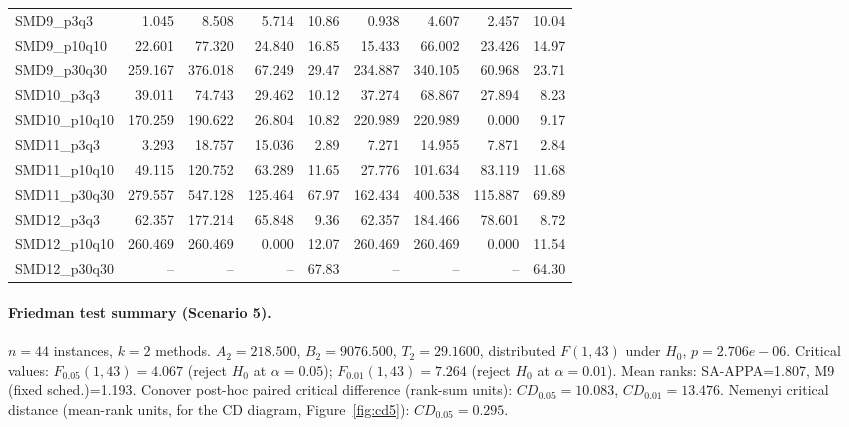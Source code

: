 \begin{longtable}{lrrrrrrrr}
SMD9\_p3q3 & 1.045 & 8.508 & 5.714 & 10.86 & 0.938 & 4.607 & 2.457 & 10.04 \\
SMD9\_p10q10 & 22.601 & 77.320 & 24.840 & 16.85 & 15.433 & 66.002 & 23.426 & 14.97 \\
SMD9\_p30q30 & 259.167 & 376.018 & 67.249 & 29.47 & 234.887 & 340.105 & 60.968 & 23.71 \\
SMD10\_p3q3 & 39.011 & 74.743 & 29.462 & 10.12 & 37.274 & 68.867 & 27.894 & 8.23 \\
SMD10\_p10q10 & 170.259 & 190.622 & 26.804 & 10.82 & 220.989 & 220.989 & 0.000 & 9.17 \\
SMD11\_p3q3 & 3.293 & 18.757 & 15.036 & 2.89 & 7.271 & 14.955 & 7.871 & 2.84 \\
SMD11\_p10q10 & 49.115 & 120.752 & 63.289 & 11.65 & 27.776 & 101.634 & 83.119 & 11.68 \\
SMD11\_p30q30 & 279.557 & 547.128 & 125.464 & 67.97 & 162.434 & 400.538 & 115.887 & 69.89 \\
SMD12\_p3q3 & 62.357 & 177.214 & 65.848 & 9.36 & 62.357 & 184.466 & 78.601 & 8.72 \\
SMD12\_p10q10 & 260.469 & 260.469 & 0.000 & 12.07 & 260.469 & 260.469 & 0.000 & 11.54 \\
SMD12\_p30q30 & -- & -- & -- & 67.83 & -- & -- & -- & 64.30 \\
\end{longtable}
\endgroup

\paragraph{Friedman test summary (Scenario 5).}
$n=44$ instances, $k=2$ methods. $A_2=218.500$, $B_2=9076.500$, $T_2=29.1600$, distributed $F(1,43)$ under $H_0$, $p=2.706e-06$. Critical values: $F_{0.05}(1,43)=4.067$ (reject $H_0$ at $\alpha=0.05$); $F_{0.01}(1,43)=7.264$ (reject $H_0$ at $\alpha=0.01$). Mean ranks: SA-APPA=1.807, M9 (fixed sched.)=1.193. Conover post-hoc paired critical difference (rank-sum units): $CD_{0.05}=10.083$, $CD_{0.01}=13.476$. Nemenyi critical distance (mean-rank units, for the CD diagram, Figure~\ref{fig:cd5}): $CD_{0.05}=0.295$.
